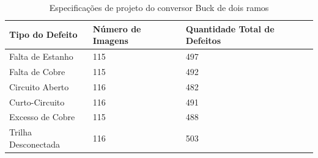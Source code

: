 \begin{table}[htbp]
\centering
\caption{Especificações de projeto do conversor Buck \Interleaved de dois ramos}
\label{tab:treinamento-dataset}
\begin{tabular}{@{}|m{}|m{}|m{}|@{}}
\hline
\textbf{Tipo do Defeito} & \textbf{Número de Imagens} & \textbf{Quantidade Total de Defeitos} \\
\hline
Falta de Estanho    & 115   & 497 \\
Falta de Cobre      & 115   & 492 \\
Circuito Aberto     & 116   & 482 \\
Curto-Circuito      & 116   & 491 \\
Excesso de Cobre    & 115   & 488 \\
Trilha Desconectada & 116   & 503 \\
\hline
\end{tabular}
\end{table}

